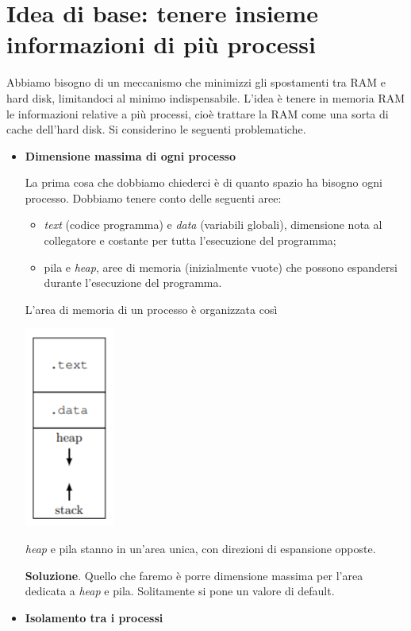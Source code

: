 \documentclass[11pt]{report}
\theoremstyle{definition}
\begin{document}
\section{Idea di base: tenere insieme informazioni di più processi} Abbiamo bisogno di un meccanismo che minimizzi gli spostamenti tra RAM e hard disk, limitandoci al minimo indispensabile. L'idea è tenere in memoria RAM le informazioni relative a più processi, cioè trattare la RAM come una sorta di cache dell'hard disk. Si considerino le seguenti problematiche.
\begin{itemize}
	\item \textbf{Dimensione massima di ogni processo} 
	
	La prima cosa che dobbiamo chiederci è di quanto spazio ha bisogno ogni processo. Dobbiamo tenere conto delle seguenti aree:
	\begin{itemize}
		\item \emph{text} (codice programma) e \emph{data} (variabili globali), dimensione nota al collegatore e costante per tutta l'esecuzione del programma;
		\item pila e \emph{heap}, aree di memoria (inizialmente vuote) che possono espandersi durante l'esecuzione del programma.
	\end{itemize}
	L'area di memoria di un processo è organizzata così
	\begin{center}
		\includegraphics{img/208.PNG}
	\end{center}
	\emph{heap} e pila stanno in un'area unica, con direzioni di espansione opposte.  
	
	\noindent \textbf{Soluzione}. Quello che faremo è porre dimensione massima per l'area dedicata a \emph{heap} e pila. Solitamente si pone un valore di default. 
	
	\item \textbf{Isolamento tra i processi}	
	

\end{itemize}
\end{document}
